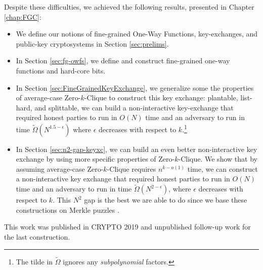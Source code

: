 Despite these difficulties, we achieved the following results, presented in Chapter \ref{chap:FGC}:
\begin{itemize}
	\item We define our notions of fine-grained One-Way Functions, key-exchanges, and public-key cryptosystems in Section \ref{sec:prelims}.
	\item In Section \ref{sec:fg-owfs}, we define and construct fine-grained one-way functions and hard-core bits.
	\item In Section \ref{sec:FineGrainedKeyExchange}, we generalize some the properties of average-case Zero-$k$-Clique to construct this key exchange: plant\-able, list-hard, and splittable, we can build a non-interactive key-exchange that required honest parties to run in $O(N)$ time and an adversary to run in time $\tilde{\Omega}(N^{1.5 - \epsilon})$ where $\epsilon$ decreases with respect to $k$.\footnote{The tilde in $\tilde \Omega$ ignores any \emph{subpolynomial} factors.}

	\item In Section \ref{sec:n2-gap-keyxc}, we can build an even better non-interactive key exchange by using more specific properties of Zero-$k$-Clique. We show that by assuming average-case Zero-$k$-Clique requires $n^{k - o(1)}$ time, we can construct a non-interactive key exchange that required honest parties to run in $O(N)$ time and an adversary to run in time $\tilde\Omega(N^{2 - \epsilon})$, where $\epsilon$ decreases with respect to $k$. This $N^2$ gap is the best we are able to do since we base these constructions on Merkle puzzles \cite{optimalMerklePuzzles}.
\end{itemize}
This work was published in CRYPTO 2019 \cite{LLVW19} and unpublished follow-up work for the last construction.


